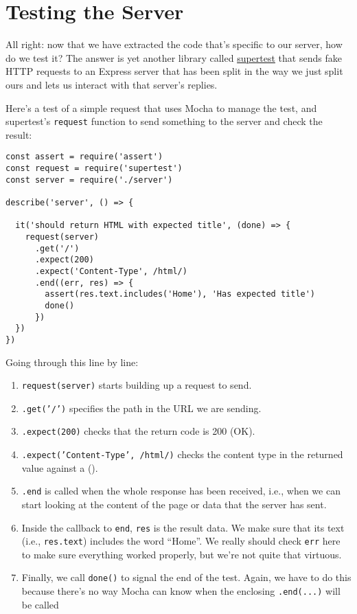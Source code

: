 \section{Testing the Server}\label{s:testing-server}

All right:
now that we have extracted the code that's specific to our server,
how do we test it?
The answer is yet another library called \href{https://github.com/visionmedia/supertest}{supertest}
that sends fake HTTP requests to an Express server
that has been split in the way we just split ours
and lets us interact with that server's replies.


Here's a test of a simple request that uses Mocha to manage the test,
and supertest's \texttt{request} function to send something to the server
and check the result:

\begin{verbatim}
const assert = require('assert')
const request = require('supertest')
const server = require('./server')

describe('server', () => {

  it('should return HTML with expected title', (done) => {
    request(server)
      .get('/')
      .expect(200)
      .expect('Content-Type', /html/)
      .end((err, res) => {
        assert(res.text.includes('Home'), 'Has expected title')
        done()
      })
  })
})
\end{verbatim}

Going through this line by line:

\begin{enumerate}
\item
  \texttt{request(server)} starts building up a request to send.
\item
  \texttt{.get('/')} specifies the path in the URL we are sending.
\item
  \texttt{.expect(200)} checks that the return code is 200 (OK).
\item
  \texttt{.expect('Content-Type',\ /html/)}
  checks the content type in the returned value against
  a  ().
\item
  \texttt{.end} is called when the whole response has been received,
  i.e., when we can start looking at the content of the page or data
  that the server has sent.
\item
  Inside the callback to \texttt{end},
  \texttt{res} is the result data.
  We make sure that its text (i.e., \texttt{res.text}) includes the word ``Home''.
  We really should check \texttt{err} here to make sure everything worked properly,
  but we're not quite that virtuous.
\item
  Finally, we call \texttt{done()} to signal the end of the test.
  Again,
  we have to do this because there's no way Mocha can know
  when the enclosing \texttt{.end(...)} will be called
\end{enumerate}

